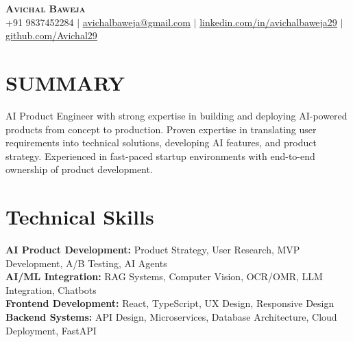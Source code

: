 \documentclass[letterpaper,10pt]{article}
\begin{document}
\begin{center}
    \textbf{\Huge \scshape Avichal Baweja} \\ \vspace{1pt}
    \small +91 9837452284 $|$ \href{mailto:avichalbaweja@gmail.com}{\underline{avichalbaweja@gmail.com}} $|$
    \href{https://www.linkedin.com/in/avichalbaweja29/}{\underline{linkedin.com/in/avichalbaweja29}} $|$
    \href{https://github.com/avichal29}{\underline{github.com/Avichal29}}
\end{center}

\section{SUMMARY}
AI Product Engineer with strong expertise in building and deploying AI-powered products from concept to production. Proven expertise in translating user requirements into technical solutions, developing AI features, and product strategy. Experienced in fast-paced startup environments with end-to-end ownership of product development.

\section{Technical Skills}
\begin{itemize}[leftmargin=0.2in, label={}]
    \small{\item{
    \textbf{AI Product Development:} Product Strategy, User Research, MVP Development, A/B Testing, AI Agents \\
    \textbf{AI/ML Integration:} RAG Systems, Computer Vision, OCR/OMR, LLM Integration, Chatbots \\
    \textbf{Frontend Development:} React, TypeScript, UX Design, Responsive Design \\
    \textbf{Backend Systems:} API Design, Microservices, Database Architecture, Cloud Deployment, FastAPI \\
    }}
\end{itemize}
\end{document}
